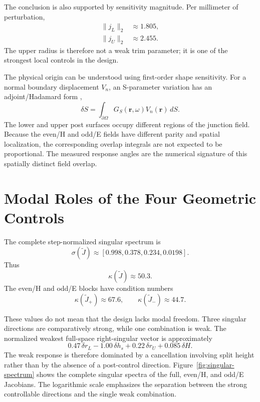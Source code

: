 \documentclass[journal]{IEEEtran}
\begin{document}
The conclusion is also supported by sensitivity magnitude.
Per millimeter of perturbation,
\begin{align}
\|j_L\|_2&\approx1.805,\\
\|j_U\|_2&\approx2.455.
\end{align}
The upper radius is therefore not a weak trim parameter; it is one of the strongest local controls in the design.

The physical origin can be understood using first-order shape sensitivity.
For a normal boundary displacement $V_n$, an S-parameter variation has an adjoint/Hadamard form \cite{zhu2009,dadash2014},
\begin{equation}
\delta S=
\int_{\partial\Omega}
G_S(\bm r,\omega)V_n(\bm r)\,dS.
\end{equation}
The lower and upper post surfaces occupy different regions of the junction field.
Because the even/H and odd/E fields have different parity and spatial localization, the corresponding overlap integrals are not expected to be proportional.
The measured response angles are the numerical signature of this spatially distinct field overlap.

\section{Modal Roles of the Four Geometric Controls}
The complete step-normalized singular spectrum is
\begin{equation}
\boxed{
\sigma(\widetilde J)
\approx[0.998,0.378,0.234,0.0198]
}.
\end{equation}
Thus
\begin{equation}
\boxed{\kappa(\widetilde J)\approx50.3}.
\end{equation}
The even/H and odd/E blocks have condition numbers
\begin{equation}
\kappa(\widetilde J_+)\approx67.6,\qquad
\kappa(\widetilde J_-)\approx44.7.
\end{equation}

These values do not mean that the design lacks modal freedom.
Three singular directions are comparatively strong, while one combination is weak.
The normalized weakest full-space right-singular vector is approximately
\begin{equation}
0.47\,\delta r_L
-1.00\,\delta h_s
+0.22\,\delta r_U
+0.085\,\delta H.
\end{equation}
The weak response is therefore dominated by a cancellation involving split height rather than by the absence of a post-control direction.
Figure~\ref{fig:singular-spectrum} shows the complete singular spectra of the full, even/H, and odd/E Jacobians.  The logarithmic scale emphasizes the separation between the strong controllable directions and the single weak combination.
\end{document}
